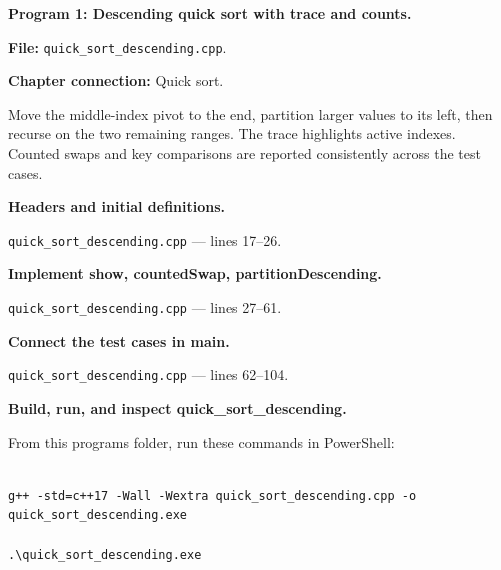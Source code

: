 \textbf{Program 1: Descending quick sort with trace and counts.}

\textbf{File:} \texttt{quick\_sort\_descending.cpp}.

\textbf{Chapter connection:} Quick sort.

Move the middle-index pivot to the end, partition larger values to its left, then recurse on the two remaining ranges. The trace highlights active indexes. Counted swaps and key comparisons are reported consistently across the test cases.



\begin{utpsteps}\setcounter{enumi}{0}\item \textbf{Headers and initial definitions.}\end{utpsteps}

\texttt{quick\_sort\_descending.cpp} --- lines 17--26.




\tcbbreak

\begin{utpsteps}\setcounter{enumi}{1}\item \textbf{Implement show, countedSwap, partitionDescending.}\end{utpsteps}

\texttt{quick\_sort\_descending.cpp} --- lines 27--61.






\tcbbreak

\begin{utpsteps}\setcounter{enumi}{2}\item \textbf{Connect the test cases in main.}\end{utpsteps}

\texttt{quick\_sort\_descending.cpp} --- lines 62--104.




\tcbbreak

\textbf{Build, run, and inspect quick\_sort\_descending.}

From this program\textquotesingle s folder, run these commands in PowerShell:

\begin{lstlisting}[style=utpterminal,language={}]

g++ -std=c++17 -Wall -Wextra quick_sort_descending.cpp -o quick_sort_descending.exe

.\quick_sort_descending.exe

\end{lstlisting}

